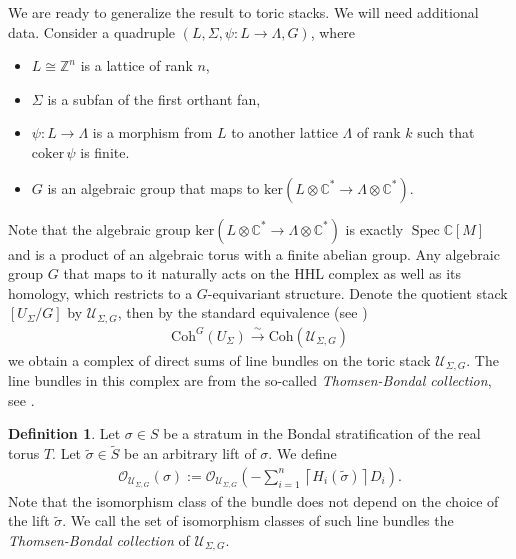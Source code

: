 \documentclass[11pt,reqno]{amsart}
\def\C {{\mathbb C}}
\def\Z {{\mathbb Z}}
\theoremstyle{definition}
\newtheorem{definition}[theorem]{Definition}
\numberwithin{equation}{section}
\begin{document}
We are ready to generalize the result to toric stacks. We will need additional data. Consider a quadruple $(L,\Sigma,\psi: L\rightarrow \Lambda, G)$, where
\begin{itemize}
    \item $L\cong \Z^n$ is a lattice of rank $n$,
    \item $\Sigma$ is a subfan of the first orthant fan,
    \item $\psi:L\rightarrow\Lambda$ is a morphism from $L$ to another lattice $\Lambda$ of rank $k$ such that $\mathrm{coker}\,\psi$ is finite.
    \item $G$ is an algebraic group that maps to $\mathrm{ker}(L\otimes\C^*\rightarrow\Lambda\otimes\C^*)$. 
\end{itemize}
Note that the algebraic group $\mathrm{ker}(L\otimes\C^*\rightarrow\Lambda\otimes\C^*)$ is exactly $\operatorname{Spec}\C[M]$ and is a product of an algebraic torus with a finite abelian group. Any algebraic group $G$ that maps to it naturally acts on the HHL complex as well as its homology, which restricts to a $G$-equivariant structure. Denote the quotient stack $[U_{\Sigma}/G]$ by $\mathcal{U}_{\Sigma,G}$, then by the standard equivalence (see \cite{Vistoli})
\begin{align}\label{eq-equivalence}
    \mathrm{Coh}^{G}(U_{\Sigma})\xrightarrow{\sim}\mathrm{Coh}(\mathcal{U}_{\Sigma,G})
\end{align}
we obtain a complex of direct sums of line bundles on the toric stack $\mathcal{U}_{\Sigma,G}$. The line bundles in this complex are from the so-called \textit{Thomsen-Bondal collection}, see \cite[Section 2.3]{HHL}.

\smallskip

\begin{definition}
    Let $\sigma \in S$ be a stratum in the Bondal stratification of the real torus $T$. Let $\widetilde{\sigma}\in \widetilde{S}$ be an arbitrary lift of $\sigma$. We define
    \begin{align*}
        \mathcal{O}_{\mathcal{U}_{\Sigma,G}}(\sigma):=\mathcal{O}_{\mathcal{U}_{\Sigma,G}}\left( - \sum_{i=1}^n \left\lceil H_{i}(\widetilde{\sigma})  \right\rceil D_{i} \right).
    \end{align*}
    Note that the isomorphism class of the bundle does not depend on the choice of the lift $\widetilde{\sigma}$. We call the set of isomorphism classes of such line bundles  the \textit{Thomsen-Bondal collection} of $\mathcal{U}_{\Sigma,G}$.
\end{definition}
\end{document}
